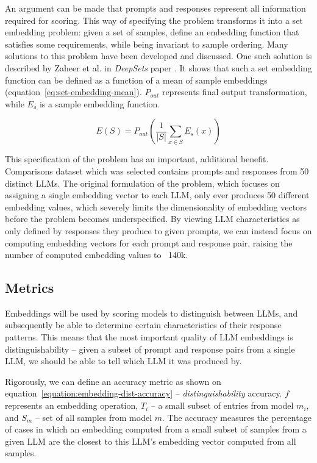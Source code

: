 \documentclass[a4paper,11pt,twoside]{report}
\theoremstyle{definition}
\begin{document}
An argument can be made that prompts and responses represent all information required for scoring. This way of specifying the problem transforms it into a set embedding problem: given a set of samples, define an embedding function that satisfies some requirements, while being invariant to sample ordering. Many solutions to this problem have been developed and discussed. One such solution is described by Zaheer et al. in \textit{DeepSets} paper \cite{zaheer2017deep}. It shows that such a set embedding function can be defined as a function of a mean of sample embeddings (equation~\ref{eq:set-embedding-mean}). $P_{out}$ represents final output transformation, while $E_s$ is a sample embedding function. 

\begin{equation}
\label{eq:set-embedding-mean}
    E(S) = P_{out}(\frac{1}{\vert S \vert} \sum_{x \in S} E_s(x))
\end{equation}

This specification of the problem has an important, additional benefit. Comparisons dataset which was selected contains prompts and responses from 50 distinct LLMs. The original formulation of the problem, which focuses on assigning a single embedding vector to each LLM, only ever produces 50 different embedding values, which severely limits the dimensionality of embedding vectors before the problem becomes underspecified. By viewing LLM characteristics as only defined by responses they produce to given prompts, we can instead focus on computing embedding vectors for each prompt and response pair, raising the number of computed embedding values to ~140k.

\subsection{Metrics}

Embeddings will be used by scoring models to distinguish between LLMs, and subsequently be able to determine certain characteristics of their response patterns. This means that the most important quality of LLM embeddings is distinguishability -- given a subset of prompt and response pairs from a single LLM, we should be able to tell which LLM it was produced by. 

Rigorously, we can define an accuracy metric as shown on equation~\ref{equation:embedding-dist-accuracy} -- \textit{distinguishability} accuracy. $f$ represents an embedding operation, $T_i$ -- a small subset of entries from model $m_i$, and $S_m$ -- set of all samples from model $m$. The accuracy measures the percentage of cases in which an embedding computed from a small subset of samples from a given LLM are the closest to this LLM's embedding vector computed from all samples. 
\end{document}

